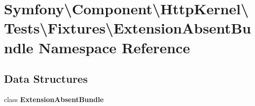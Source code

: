 \section{Symfony\textbackslash{}Component\textbackslash{}Http\+Kernel\textbackslash{}Tests\textbackslash{}Fixtures\textbackslash{}Extension\+Absent\+Bundle Namespace Reference}
\label{namespace_symfony_1_1_component_1_1_http_kernel_1_1_tests_1_1_fixtures_1_1_extension_absent_bundle}
\subsection*{Data Structures}
\begin{DoxyCompactItemize}
\item 
class {\bf Extension\+Absent\+Bundle}
\end{DoxyCompactItemize}
